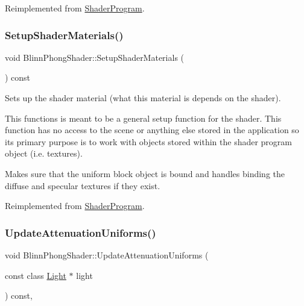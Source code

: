 Reimplemented from \hyperlink{class_shader_program_a02cf3df43c59808160fce158ad655a40}{Shader\+Program}.

\hypertarget{class_blinn_phong_shader_a444db9ffe3d55dbbb55ced8cf4abb705}{}\label{class_blinn_phong_shader_a444db9ffe3d55dbbb55ced8cf4abb705} 
\subsubsection{\texorpdfstring{Setup\+Shader\+Materials()}{SetupShaderMaterials()}}
{\footnotesize\ttfamily void Blinn\+Phong\+Shader\+::\+Setup\+Shader\+Materials (\begin{DoxyParamCaption}{ }\end{DoxyParamCaption}) const\hspace{0.3cm}{\ttfamily [virtual]}}



Sets up the shader material (what this material is depends on the shader). 

This functions is meant to be a general setup function for the shader. This function has no access to the scene or anything else stored in the application so its primary purpose is to work with objects stored within the shader program object (i.\+e. textures).

Makes sure that the uniform block object is bound and handles binding the diffuse and specular textures if they exist. 

Reimplemented from \hyperlink{class_shader_program_a20ea5669f122fa6143e7fa8ee9d92578}{Shader\+Program}.

\hypertarget{class_blinn_phong_shader_a389b3b5fea85eb6deedfc028c4140632}{}\label{class_blinn_phong_shader_a389b3b5fea85eb6deedfc028c4140632} 
\subsubsection{\texorpdfstring{Update\+Attenuation\+Uniforms()}{UpdateAttenuationUniforms()}}
{\footnotesize\ttfamily void Blinn\+Phong\+Shader\+::\+Update\+Attenuation\+Uniforms (\begin{DoxyParamCaption}\item[{const class \hyperlink{class_light}{Light} $\ast$}]{light }\end{DoxyParamCaption}) const\hspace{0.3cm}{\ttfamily [protected]}, {\ttfamily [virtual]}}

